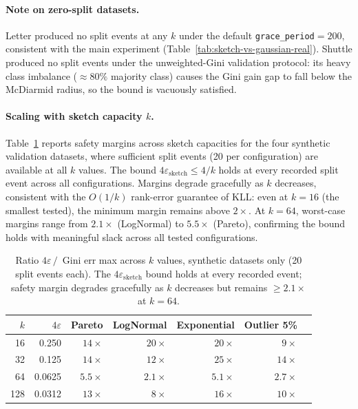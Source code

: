 \documentclass{article}
\begin{document}
\paragraph{Note on zero-split datasets.}
Letter produced no split events at any $k$ under the default
\texttt{grace\_period}$=200$, consistent with the main experiment
(Table~\ref{tab:sketch-vs-gaussian-real}). 
Shuttle produced no split events under the unweighted-Gini validation
protocol: its heavy class imbalance (${\approx}80\%$ majority class)
causes the Gini gain gap to fall below the McDiarmid radius, so the
bound is vacuously satisfied.

\paragraph{Scaling with sketch capacity $k$.}

Table~\ref{tab:sketch-bound-kscale} reports safety margins across sketch
capacities for the four synthetic validation datasets, where sufficient split
events (20 per configuration) are available at all $k$ values.
The bound $4\varepsilon_{\mathrm{sketch}} \leq 4/k$ holds at every recorded
split event across all configurations. Margins degrade gracefully as $k$
decreases, consistent with the $O(1/k)$ rank-error guarantee of KLL: even at $k{=}16$ (the smallest tested), the minimum margin remains above
$2\times$. At $k{=}64$, worst-case margins range from $2.1\times$
(LogNormal) to $5.5\times$ (Pareto), confirming the bound holds with
meaningful slack across all tested configurations.

\begin{table}[h]
\centering
\caption{Ratio $4\varepsilon \,/\,$ Gini err max across $k$ values,
synthetic datasets only (20 split events each).
The $4\varepsilon_{\mathrm{sketch}}$ bound holds at every recorded event;
safety margin degrades gracefully as $k$ decreases but remains $\geq 2.1\times$
at $k{=}64$.}
\label{tab:sketch-bound-kscale}
\begin{tabular}{rrrrrrr}
\toprule
$k$ & $4\varepsilon$ & Pareto & LogNormal & Exponential & Outlier 5\% \\
\midrule
16  & 0.250  & $14\times$ & $20\times$ & $20\times$ & $9\times$  \\
32  & 0.125  & $14\times$ & $12\times$ & $25\times$ & $14\times$ \\
64  & 0.0625 & $5.5\times$ & $2.1\times$ & $5.1\times$ & $2.7\times$ \\
128 & 0.0312 & $13\times$ & $8\times$  & $16\times$ & $10\times$ \\
\bottomrule
\end{tabular}
\end{table}
\end{document}
